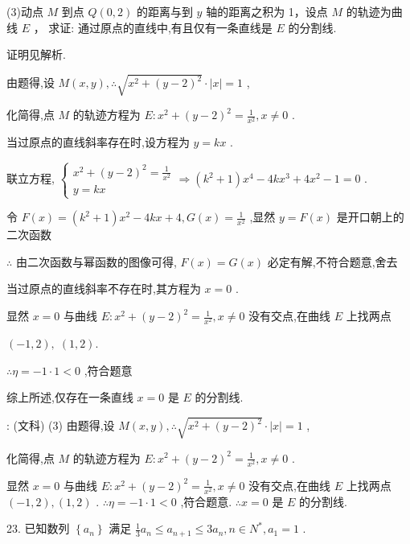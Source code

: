 \documentclass[10pt]{article}
\newcommand*\circled[1]{\tikz[baseline=(char.base)]{\node[shape=circle,draw,inner sep=1.5pt] (char) {\small #1};}}
\begin{document}
(3)动点 \(M\) 到点 \(Q\left( {0,2}\right)\) 的距离与到 \(y\) 轴的距离之积为 1，设点 \(M\) 的轨迹为曲线 \(E\) ， 求证: 通过原点的直线中,有且仅有一条直线是 \(E\) 的分割线.

证明见解析.

由题得,设 \(M\left( {x,y}\right) ,\therefore \sqrt{{x}^{2} + {\left( y - 2\right) }^{2}} \cdot  \left| x\right|  = 1\) ,

化简得,点 \(M\) 的轨迹方程为 \(E : {x}^{2} + {\left( y - 2\right) }^{2} = \frac{1}{{x}^{2}},x \neq  0\) .

 \circled{1} 当过原点的直线斜率存在时,设方程为 \(y = {kx}\) .

联立方程, \(\left\{  {\begin{array}{l} {x}^{2} + {\left( y - 2\right) }^{2} = \frac{1}{{x}^{2}} \\  y = {kx} \end{array} \Rightarrow  \left( {{k}^{2} + 1}\right) {x}^{4} - {4k}{x}^{3} + 4{x}^{2} - 1 = 0}\right.\) .

令 \(F\left( x\right)  = \left( {{k}^{2} + 1}\right) {x}^{2} - {4kx} + 4,G\left( x\right)  = \frac{1}{{x}^{2}}\) ,显然 \(y = F\left( x\right)\) 是开口朝上的二次函数

\(\therefore\) 由二次函数与幂函数的图像可得, \(F\left( x\right)  = G\left( x\right)\) 必定有解,不符合题意,舍去

 \circled{2} 当过原点的直线斜率不存在时,其方程为 \(x = 0\) .

显然 \(x = 0\) 与曲线 \(E : {x}^{2} + {\left( y - 2\right) }^{2} = \frac{1}{{x}^{2}},x \neq  0\) 没有交点,在曲线 \(E\) 上找两点

\(\left( {-1,2}\right) ,\;\left( {1,2}\right) .\)

\(\therefore \eta  =  - 1 \cdot  1 < 0\) ,符合题意

综上所述,仅存在一条直线 \(x = 0\) 是 \(E\) 的分割线.

: (文科) (3) 由题得,设 \(M\left( {x,y}\right) ,\therefore \sqrt{{x}^{2} + {\left( y - 2\right) }^{2}} \cdot  \left| x\right|  = 1\) ,

化简得,点 \(M\) 的轨迹方程为 \(E : {x}^{2} + {\left( y - 2\right) }^{2} = \frac{1}{{x}^{2}},x \neq  0\) .

显然 \(x = 0\) 与曲线 \(E : {x}^{2} + {\left( y - 2\right) }^{2} = \frac{1}{{x}^{2}},x \neq  0\) 没有交点,在曲线 \(E\) 上找两点 \(\left( {-1,2}\right) ,\left( {1,2}\right)\) . \(\therefore \eta  =  - 1 \cdot  1 < 0\) ,符合题意. \(\therefore x = 0\) 是 \(E\) 的分割线.

23. 已知数列 \(\left\{  {a}_{n}\right\}\) 满足 \(\frac{1}{3}{a}_{n} \leq  {a}_{n + 1} \leq  3{a}_{n},n \in  {N}^{ * },{a}_{1} = 1\) .
\end{document}
